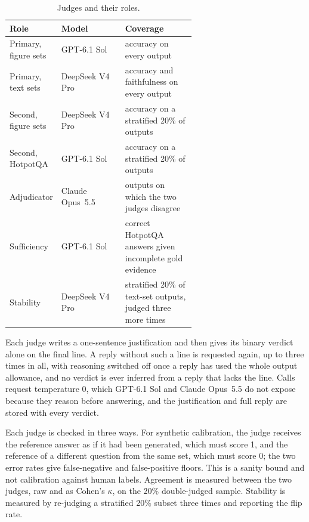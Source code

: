 \documentclass[preprint,12pt]{elsarticle}
\begin{document}
\begin{table}[t]
\caption{Judges and their roles.}
\label{tab:judges}
\centering
\footnotesize
\begin{tabular}{@{}>{\raggedright\arraybackslash}p{0.24\linewidth}l>{\raggedright\arraybackslash}p{0.38\linewidth}@{}}
\toprule
Role & Model & Coverage \\
\midrule
Primary, figure sets & GPT-6.1 Sol & accuracy on every output \\
Primary, text sets & DeepSeek V4 Pro & accuracy and faithfulness on every output \\
Second, figure sets  & DeepSeek V4 Pro & accuracy on a stratified 20\% of outputs \\
Second, HotpotQA     & GPT-6.1 Sol & accuracy on a stratified 20\% of outputs \\
Adjudicator          & Claude Opus~5.5 & outputs on which the two judges disagree \\
Sufficiency          & GPT-6.1 Sol & correct HotpotQA answers given incomplete gold evidence \\
Stability            & DeepSeek V4 Pro & stratified 20\% of text-set outputs, judged three more times \\
\bottomrule
\end{tabular}
\end{table}

Each judge writes a one-sentence justification and then gives its binary
verdict alone on the final line. A reply without such a line is requested
again, up to three times in all, with reasoning switched off once a reply has
used the whole output allowance, and no verdict is ever inferred from a reply
that lacks the line. Calls request temperature 0, which GPT-6.1 Sol and Claude
Opus~5.5 do not expose because they reason before answering, and the
justification and full reply are stored with every verdict.

Each judge is checked in three ways. For synthetic calibration, the judge
receives the reference answer as if it had been generated, which must score 1,
and the reference of a different question from the same set, which must score
0; the two error rates give false-negative and false-positive floors. This is a
sanity bound and not calibration against human labels. Agreement is measured
between the two judges, raw and as Cohen's $\kappa$, on the 20\% double-judged
sample. Stability is measured by
re-judging a stratified 20\% subset three times and reporting the flip rate.
\end{document}
